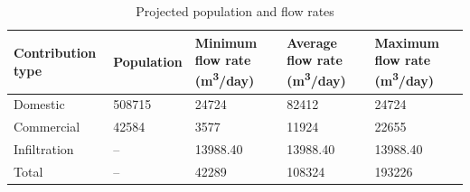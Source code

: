 \begin{table}[h]
    \centering
    \caption{Projected population and flow rates}
    \label{tab:projected_rates}
    \begin{tabular}{|p{3cm}|p{2.5cm}|p{3cm}|p{3cm}|p{3cm}|}
      \hline
      \textbf{Contribution type} & \textbf{Population} & \textbf{Minimum flow rate (m\textsuperscript{3}/day)} & \textbf{Average flow rate (m\textsuperscript{3}/day)} & \textbf{Maximum flow rate (m\textsuperscript{3}/day)} \\
      \hline
        Domestic  & 508715 & 24724 & 82412 & 24724\\
        Commercial & 42584 & 3577 & 11924 & 22655 \\
        Infiltration & -- & 13988.40 & 13988.40 & 13988.40 \\
        Total & -- & 42289 & 108324 & 193226 \\
      \hline
    \end{tabular}
\end{table}
